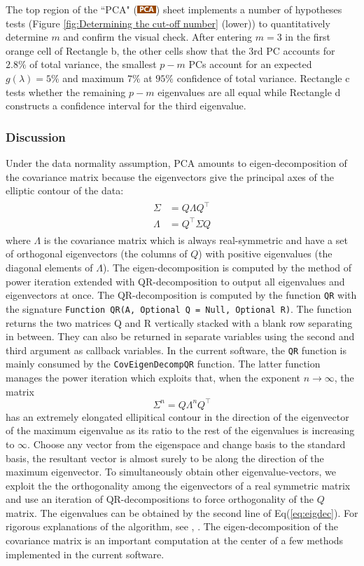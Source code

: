 \documentclass[article]{jss}
\numberwithin{equation}{subsection}
\newcommand{\shtPCA}{``PCA" (\includegraphics[height=8pt, keepaspectratio=true]{PcaSheetTab_png}) }
\begin{document}
        The top region of the \shtPCA sheet implements a number of hypotheses tests (Figure \ref{fig:Determining the cut-off number} (lower)) to quantitatively determine $m$ and confirm the visual check.         
        After entering $m=3$ in the first orange cell of Rectangle b, the other cells show that the 3rd PC accounts for $2.8\%$ of total variance, the smallest $p-m$ PCs account for an expected $g(\lambda)=5\%$ and maximum $7\%$ at $95\%$ confidence of total variance. Rectangle c tests whether the remaining $p-m$ eigenvalues are all equal while Rectangle d constructs a confidence interval for the third eigenvalue.
        
        \subsubsection{Discussion}Under the data normality assumption, PCA amounts to eigen-decomposition of the covariance matrix because the eigenvectors give the principal axes of the elliptic contour of the data: 
        \begin{align}\label{eq:eigdec}
        \begin{split}
        \Sigma &= Q\Lambda Q^\intercal \\
        \Lambda &= Q^\intercal \Sigma Q 
        \end{split}
        \end{align}
        where $\Lambda$ is the covariance matrix which is always real-symmetric and have a set of orthogonal eigenvectors (the columns of $Q$) with positive eigenvalues (the diagonal elements of $\Lambda$). The eigen-decomposition is computed by the method of power iteration extended with QR-decomposition to output all eigenvalues and eigenvectors at once. The QR-decomposition is computed by the  function \texttt{QR} with the signature \texttt{Function QR(A, Optional Q = Null, Optional R)}. The function returns the two matrices Q and R vertically stacked with a blank row separating in between. They can also be returned in separate variables using the second and third argument as callback variables. In the current software, the \texttt{QR} function is mainly consumed by the \texttt{CovEigenDecompQR} function. The latter function manages the power iteration which exploits that, when the exponent $n\rightarrow\infty$, the matrix $$\Sigma^n=Q\Lambda^nQ^\intercal$$ has an extremely elongated ellipitical contour in the direction of the eigenvector of the maximum eigenvalue as its ratio to the rest of the eigenvalues is increasing to $\infty$.  Choose any vector from the eigenspace and change basis to the standard basis, the resultant vector is almost surely to be along the direction of the maximum eigenvector. To simultaneously obtain other eigenvalue-vectors, we exploit the the orthogonality among the eigenvectors of a real symmetric matrix and use an iteration of QR-decompositions to force orthogonality of the $Q$ matrix. The eigenvalues can be obtained by the second line of Eq(\ref{eq:eigdec}). For rigorous explanations of the algorithm, see \cite{GolubVanLoan2012MatrixComputations4e}, \cite{SauerT2011NumericalAnalysis2e}. The eigen-decomposition of the covariance matrix is an important computation at the center of a few methods implemented in the current software.
        
\end{document}
